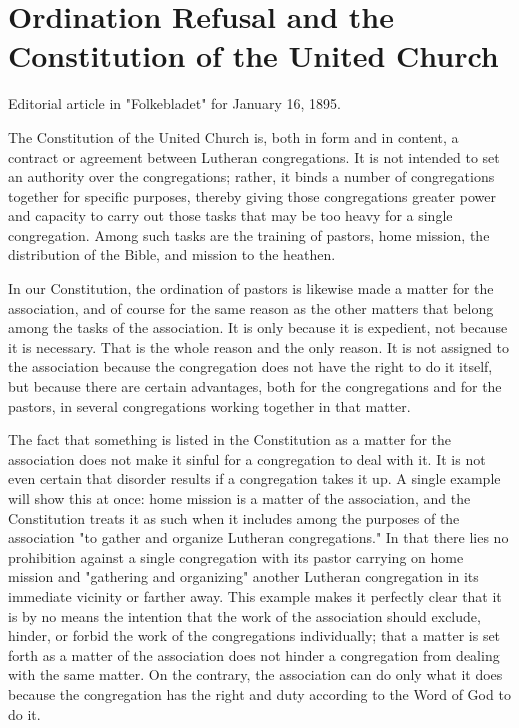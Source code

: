
\section{Ordination Refusal and the Constitution of the United Church}

Editorial article in "Folkebladet" for January 16, 1895.

The Constitution of the United Church is, both in form and in content, a contract or agreement between Lutheran congregations. It is not intended to set an authority over the congregations; rather, it binds a number of congregations together for specific purposes, thereby giving those congregations greater power and capacity to carry out those tasks that may be too heavy for a single congregation. Among such tasks are the training of pastors, home mission, the distribution of the Bible, and mission to the heathen.

In our Constitution, the ordination of pastors is likewise made a matter for the association, and of course for the same reason as the other matters that belong among the tasks of the association. It is only because it is expedient, not because it is necessary. That is the whole reason and the only reason. It is not assigned to the association because the congregation does not have the right to do it itself, but because there are certain advantages, both for the congregations and for the pastors, in several congregations working together in that matter.

The fact that something is listed in the Constitution as a matter for the association does not make it sinful for a congregation to deal with it. It is not even certain that disorder results if a congregation takes it up. A single example will show this at once: home mission is a matter of the association, and the Constitution treats it as such when it includes among the purposes of the association "to gather and organize Lutheran congregations." In that there lies no prohibition against a single congregation with its pastor carrying on home mission and "gathering and organizing" another Lutheran congregation in its immediate vicinity or farther away. This example makes it perfectly clear that it is by no means the intention that the work of the association should exclude, hinder, or forbid the work of the congregations individually; that a matter is set forth as a matter of the association does not hinder a congregation from dealing with the same matter. On the contrary, the association can do only what it does because the congregation has the right and duty according to the Word of God to do it.


